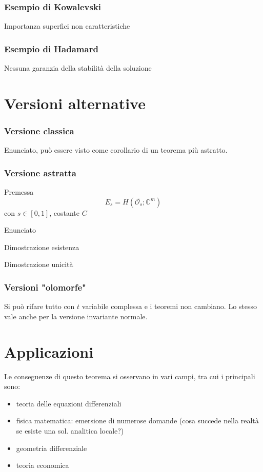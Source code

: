 \documentclass[serif,notheorems]{beamer}
\theoremstyle{plain} %
\theoremstyle{definition} %
\theoremstyle{remark}
\begin{document}
\begin{frame}
\frametitle{Esempio di Kowalevski}
Importanza superfici non caratteristiche
\end{frame}

\begin{frame}
\frametitle{Esempio di Hadamard}
Nessuna garanzia della stabilità della soluzione
\end{frame}



\section{Versioni alternative}

\begin{frame}
\frametitle{Versione classica}
Enunciato, può essere visto come corollario di un teorema più astratto.
\end{frame}

\begin{frame}
\frametitle{Versione astratta}
Premessa $$E_s = H(\overline{\mathcal{O}_s}; \mathbb{C}^m)$$ con $s \in [0,1]$, costante $C$
\end{frame}

\begin{frame}
Enunciato
\end{frame}

\begin{frame}
Dimostrazione esistenza
\end{frame}

\begin{frame}
Dimostrazione unicità
\end{frame}

\begin{frame}
\frametitle{Versioni "olomorfe"}
Si può rifare tutto con $t$ variabile complessa e i teoremi non cambiano. Lo stesso vale anche per la versione invariante normale.
\end{frame}




\section{Applicazioni}

\begin{frame}
Le conseguenze di questo teorema si osservano in vari campi, tra cui i principali sono:
\begin{itemize}
\item teoria delle equazioni differenziali
\item fisica matematica: emersione di numerose domande (cosa succede nella realtà se esiste una sol. analitica locale?)
\item geometria differenziale
\item teoria economica
\end{itemize}
\end{frame}
\end{document}
